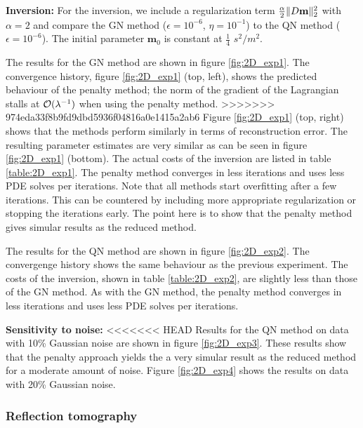 \documentclass{iopart}
\begin{document}
{\textbf{Inversion:}
For the inversion, we include a regularization term $\frac{\alpha}{2} \|D\mathbf{m}\|_2^2$ with $\alpha = 2$ and compare  the GN method ($\epsilon=10^{-6}$, $\eta=10^{-1}$) to the QN method ($\epsilon=10^{-6}$). The initial parameter $\mathbf{m}_0$ is constant at $\frac{1}{4}$ $s^2/m^2$.

The results for the GN method are shown in figure \ref{fig:2D_exp1}.
The convergence history, figure \ref{fig:2D_exp1} (top, left), shows the predicted behaviour of the penalty method; the norm of the gradient of the Lagrangian stalls at $\mathcal{O}(\lambda^{-1})$ when using the penalty method. 
>>>>>>> 974eda33f8b9fd9dbd5936f04816a0e1415a2ab6
Figure \ref{fig:2D_exp1} (top, right) shows that the methods perform similarly in terms of reconstruction error. The resulting parameter estimates are very similar as can be seen 
in figure \ref{fig:2D_exp1} (bottom). The actual costs of the inversion are listed in table \ref{table:2D_exp1}. The penalty method converges in less iterations and uses less PDE solves per iterations. Note that all methods start overfitting after a few iterations. This can be countered by including more appropriate regularization or stopping the iterations early. The point here is to show that the penalty method gives simular results as the reduced method.

The results for the QN method are shown in figure \ref{fig:2D_exp2}. The convergenge history shows the same behaviour as the previous experiment. The costs of the inversion, shown in table \ref{table:2D_exp2}, are slightly less than those of the GN method. As with the GN method, the penalty method converges in less iterations and uses less PDE solves per iterations. 

\textbf{Sensitivity to noise:}
<<<<<<< HEAD
Results for the QN method on data with 10\% Gaussian noise are shown in figure  \ref{fig:2D_exp3}. These results show that the penalty approach yields the a very simular
result as the reduced method for a moderate amount of noise. Figure \ref{fig:2D_exp4} shows the results on data with 20\% Gaussian noise. 

\subsubsection{Reflection tomography}


}
\end{document}
